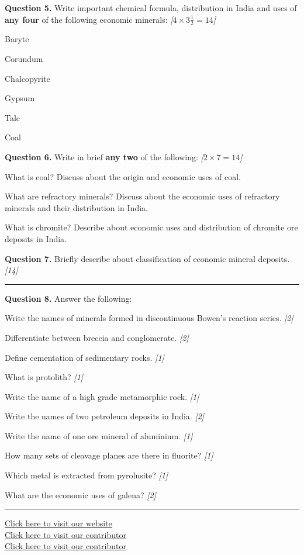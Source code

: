 \documentclass[11pt,a4paper]{article}
\newcommand{\pts}[1]{\hfill   \textit{[#1]}}
\begin{document}
\noindent   \textbf{Question 5.} Write important chemical formula, distribution in India and uses of   \textbf{any four} of the following economic minerals: \pts{$4  \times 3\frac{1}{2} = 14$}

\begin{parts}
  \item Baryte
  \item Corundum
  \item Chalcopyrite
  \item Gypsum
  \item Talc
  \item Coal
\end{parts}

\medskip


\noindent   \textbf{Question 6.} Write in brief   \textbf{any two} of the following: \pts{$2  \times 7 = 14$}

\begin{parts}
  \item What is coal? Discuss about the origin and economic uses of coal.
  \item What are refractory minerals? Discuss about the economic uses of refractory minerals and their distribution in India.
  \item What is chromite? Describe about economic uses and distribution of chromite ore deposits in India.
\end{parts}

\medskip


\noindent   \textbf{Question 7.} Briefly describe about classification of economic mineral deposits. \pts{14}

\bigskip


\rule{\linewidth}{0.4pt}\smallskip




\noindent   \textbf{Question 8.} Answer the following:

\begin{parts}
  \item Write the names of minerals formed in discontinuous Bowen's reaction series. \pts{2}
  \item Differentiate between breccia and conglomerate. \pts{2}
  \item Define cementation of sedimentary rocks. \pts{1}
  \item What is protolith? \pts{1}
  \item Write the name of a high grade metamorphic rock. \pts{1}
  \item Write the names of two petroleum deposits in India. \pts{2}
  \item Write the name of one ore mineral of aluminium. \pts{1}
  \item How many sets of cleavage planes are there in fluorite? \pts{1}
  \item Which metal is extracted from pyrolusite? \pts{1}
  \item What are the economic uses of galena? \pts{2}
\end{parts}

\vfill\rule{\linewidth}{0.4pt}

\begin{center}\small
\href{https://bhu-exam.vercel.app/}{Click here to visit our website}\\[4pt]
\href{https://me-aryan.vercel.app/}{Click here to visit our contributor}\\[4pt]
\href{https://quashan-me.vercel.app/}{Click here to visit our contributor}
\end{center}
\end{document}
